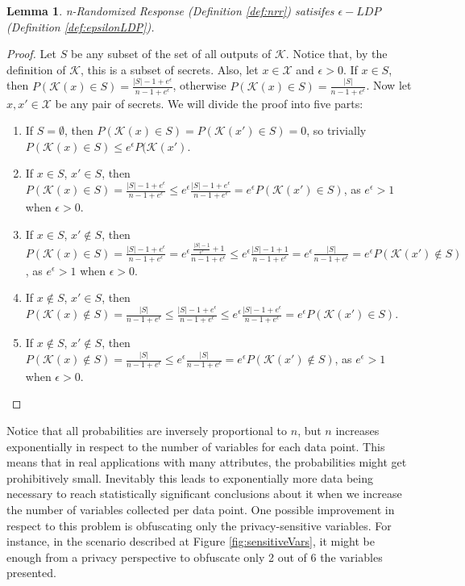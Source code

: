 \documentclass[conference]{IEEEtran}
\newtheorem{lemma}{Lemma}
\begin{document}
\begin{lemma}\label{lem:rrldp} n-Randomized Response (Definition \ref{def:nrr}) satisifes $\epsilon-LDP$ (Definition \ref{def:epsilonLDP}).
\end{lemma}
\begin{proof}
	Let $S$ be any subset of the set of all outputs of $\mathcal{K}$. Notice that, by the definition of $\mathcal{K}$, this is a subset of secrets. Also, let $x \in \mathcal{X}$ and $\epsilon > 0$.
	If $x\in S$, then $P(\mathcal{K}(x) \in S) = \frac{|S|-1+e^\epsilon}{n-1+e^\epsilon}$, otherwise $P(\mathcal{K}(x) \in S) = \frac{|S|}{n-1+e^\epsilon}$.
	Now let $x,x' \in \mathcal{X}$ be any pair of secrets. We will divide the proof into five parts:
	\begin{enumerate}
		\item If $S = \emptyset$, then $P(\mathcal{K}(x) \in S) = P(\mathcal{K}(x') \in S) = 0$, so trivially $P(\mathcal{K}(x) \in S) \leq e^\epsilon P(\mathcal{K}(x')$.
		\item If $x\in S$, $x'\in S$, then $P(\mathcal{K}(x) \in S) = \frac{|S|-1+e^\epsilon}{n-1+e^\epsilon} \leq e^\epsilon \frac{|S|-1+e^\epsilon}{n-1+e^\epsilon} = e^\epsilon P(\mathcal{K}(x')\in S)$, as $e^\epsilon > 1$ when $\epsilon > 0$.
		\item If $x\in S$, $x'\notin S$, then $P(\mathcal{K}(x) \in S) = \frac{|S|-1+e^\epsilon}{n-1+e^\epsilon} = e^\epsilon\frac{\frac{|S|-1}{e^\epsilon}+1}{n-1+e^\epsilon} \leq e^\epsilon\frac{|S|-1+1}{n-1+e^\epsilon} = e^\epsilon \frac{|S|}{n-1+e^\epsilon} = e^\epsilon P(\mathcal{K}(x')\notin S)$, as $e^\epsilon > 1$ when $\epsilon > 0$.
		\item If $x\notin S$, $x'\in S$, then $P(\mathcal{K}(x) \notin S) = \frac{|S|}{n-1+e^\epsilon} \leq \frac{|S|-1+e^\epsilon}{n-1+e^\epsilon} \leq e^\epsilon \frac{|S|-1+e^\epsilon}{n-1+e^\epsilon} = e^\epsilon P(\mathcal{K}(x')\in S)$.
		\item If $x\notin S$, $x'\notin S$, then $P(\mathcal{K}(x) \notin S) = \frac{|S|}{n-1+e^\epsilon} \leq e^\epsilon \frac{|S|}{n-1+e^\epsilon} = e^\epsilon P(\mathcal{K}(x')\notin S)$, as $e^\epsilon > 1$ when $\epsilon > 0$.
	\end{enumerate}
\end{proof}

Notice that all probabilities are inversely proportional to $n$, but $n$ increases exponentially in respect to the number of variables for each data point. This means that in real applications with many attributes, the probabilities might get prohibitively small. Inevitably this leads to exponentially more data being necessary to reach statistically significant conclusions about it when we increase the number of variables collected per data point. One possible improvement in respect to this problem is obfuscating only the privacy-sensitive variables. For instance, in the scenario described at Figure \ref{fig:sensitiveVars}, it might be enough from a privacy perspective to obfuscate only 2 out of 6 the variables presented.
\end{document}
